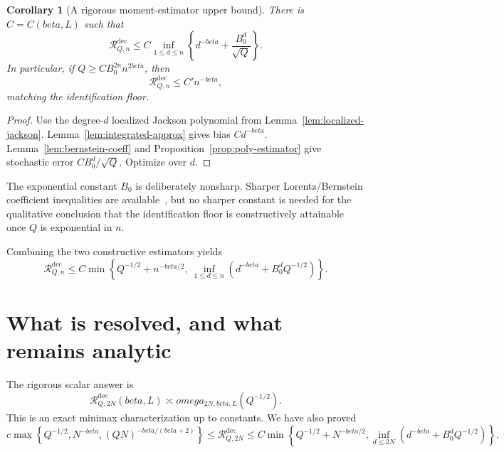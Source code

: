 \documentclass[11pt]{article}
\def\beta{beta}%
\def\omega{omega}%
\newtheorem{corollary}[theorem]{Corollary}
\newcommand{\calR}{\mathcal R}
\begin{document}
\begin{corollary}[A rigorous moment-estimator upper bound]
\label{cor:moment-upper}
There is $C=C(\beta,L)$ such that
\begin{equation}
\label{eq:moment-upper}
\calR^{\mathrm{dec}}_{Q,n}
\le
C\inf_{1\le d\le n}
\left\{d^{-\beta}+\frac{B_0^d}{\sqrt Q}\right\}.
\end{equation}
In particular, if $Q\ge C B_0^{2n} n^{2\beta}$, then
\[
\calR^{\mathrm{dec}}_{Q,n}\le C'n^{-\beta},
\]
matching the identification floor.
\end{corollary}

\begin{proof}
Use the degree-$d$ localized Jackson polynomial from Lemma~\ref{lem:localized-jackson}.  Lemma~\ref{lem:integrated-approx} gives bias $Cd^{-\beta}$.  Lemma~\ref{lem:bernstein-coeff} and Proposition~\ref{prop:poly-estimator} give stochastic error $CB_0^d/\sqrt Q$.  Optimize over $d$.
\end{proof}

The exponential constant $B_0$ is deliberately nonsharp.  Sharper Lorentz/Bernstein coefficient inequalities are available~\cite{LubinskyZiegler}, but no sharper constant is needed for the qualitative conclusion that the identification floor is constructively attainable once $Q$ is exponential in $n$.

Combining the two constructive estimators yields
\begin{equation}
\label{eq:combined-upper}
\calR^{\mathrm{dec}}_{Q,n}
\le
C\min\left\{
Q^{-1/2}+n^{-\beta/2},
\ \inf_{1\le d\le n}\left(d^{-\beta}+B_0^dQ^{-1/2}\right)
\right\}.
\end{equation}

\section{What is resolved, and what remains analytic}

The rigorous scalar answer is
\begin{equation}
\label{eq:final-modulus}
\boxed{
\calR^{\mathrm{dec}}_{Q,2N}(\beta,L)
\asymp
\omega_{2N,\beta,L}(Q^{-1/2}).
}
\end{equation}
This is an exact minimax characterization up to constants.  We have also proved
\begin{equation}
\label{eq:explicit-sandwich}
 c\max\left\{
 Q^{-1/2},
 N^{-\beta},
 (QN)^{-\beta/(\beta+2)}
 \right\}
\le
\calR^{\mathrm{dec}}_{Q,2N}
\le
 C\min\left\{
 Q^{-1/2}+N^{-\beta/2},
 \inf_{d\le2N}(d^{-\beta}+B_0^dQ^{-1/2})
 \right\}.
\end{equation}
\end{document}
